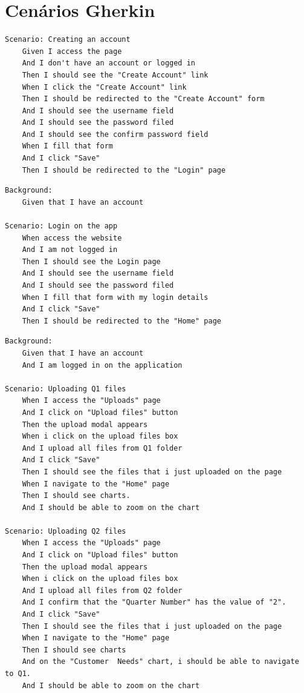 \chapter{Cenários Gherkin}
\label{ch:cenariosGherkin}

\begin{verbatim}
Scenario: Creating an account
    Given I access the page 
    And I don't have an account or logged in
    Then I should see the "Create Account" link
    When I click the "Create Account" link
    Then I should be redirected to the "Create Account" form
    And I should see the username field
    And I should see the password filed
    And I should see the confirm password field
    When I fill that form
    And I click "Save"
    Then I should be redirected to the "Login" page
\end{verbatim}



\begin{verbatim}
Background:
	Given that I have an account

Scenario: Login on the app
	When access the website
	And I am not logged in
	Then I should see the Login page
	And I should see the username field
	And I should see the password filed
	When I fill that form with my login details
	And I click "Save"
	Then I should be redirected to the "Home" page
\end{verbatim}
    
\begin{verbatim}
Background:
	Given that I have an account
	And I am logged in on the application

Scenario: Uploading Q1 files
	When I access the "Uploads" page  
	And I click on "Upload files" button 
	Then the upload modal appears 
	When i click on the upload files box
	And I upload all files from Q1 folder
	And I click "Save"
	Then I should see the files that i just uploaded on the page
	When I navigate to the "Home" page
	Then I should see charts. 
	And I should be able to zoom on the chart
	
Scenario: Uploading Q2 files
	When I access the "Uploads" page  
	And I click on "Upload files" button 
	Then the upload modal appears 
	When i click on the upload files box
	And I upload all files from Q2 folder
	And I confirm that the "Quarter Number" has the value of "2".
	And I click "Save"
	Then I should see the files that i just uploaded on the page
	When I navigate to the "Home" page
	Then I should see charts
	And on the "Customer  Needs" chart, i should be able to navigate to Q1.
	And I should be able to zoom on the chart
\end{verbatim}

